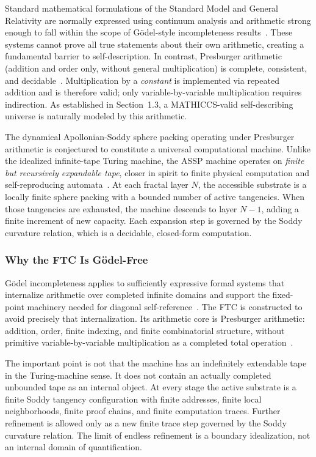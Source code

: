 \documentclass[11pt,a4paper]{article}
\begin{document}
Standard mathematical formulations of the Standard Model and General Relativity are normally expressed using continuum analysis and arithmetic strong enough to fall within the scope of Gödel-style incompleteness results~\cite{Godel1931}. These systems cannot prove all true statements about their own arithmetic, creating a fundamental barrier to self-description. In contrast, Presburger arithmetic (addition and order only, without general multiplication) is complete, consistent, and decidable~\cite{Presburger1929}. Multiplication by a \emph{constant} is implemented via repeated addition and is therefore valid; only variable-by-variable multiplication requires indirection. As established in Section~1.3, a MATHICCS-valid self-describing universe is naturally modeled by this arithmetic.

The dynamical Apollonian-Soddy sphere packing operating under Presburger arithmetic is conjectured to constitute a universal computational machine. Unlike the idealized infinite-tape Turing machine, the ASSP machine operates on \emph{finite but recursively expandable tape}, closer in spirit to finite physical computation and self-reproducing automata~\cite{VonNeumann1966,Fredkin1990,Wolfram2002}. At each fractal layer $N$, the accessible substrate is a locally finite sphere packing with a bounded number of active tangencies. When those tangencies are exhausted, the machine descends to layer $N-1$, adding a finite increment of new capacity. Each expansion step is governed by the Soddy curvature relation, which is a decidable, closed-form computation.

\subsubsection{Why the FTC Is G\"odel-Free}
\label{sec:godel_free}

G\"odel incompleteness applies to sufficiently expressive formal systems that internalize arithmetic over completed infinite domains and support the fixed-point machinery needed for diagonal self-reference~\cite{Godel1931}. The FTC is constructed to avoid precisely that internalization. Its arithmetic core is Presburger arithmetic: addition, order, finite indexing, and finite combinatorial structure, without primitive variable-by-variable multiplication as a completed total operation~\cite{Presburger1929}.

The important point is not that the machine has an indefinitely extendable tape in the Turing-machine sense. It does not contain an actually completed unbounded tape as an internal object. At every stage the active substrate is a finite Soddy tangency configuration with finite addresses, finite local neighborhoods, finite proof chains, and finite computation traces. Further refinement is allowed only as a new finite trace step governed by the Soddy curvature relation. The limit of endless refinement is a boundary idealization, not an internal domain of quantification.
\end{document}
